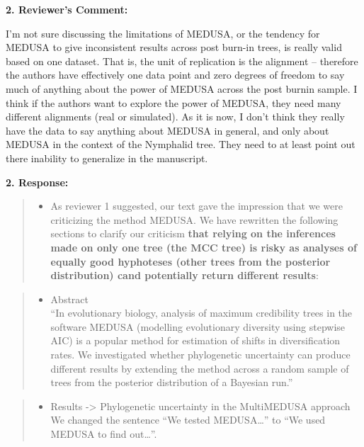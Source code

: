 \documentclass[]{article}
\begin{document}
\textbf{2. Reviewer's Comment:}

I'm not sure discussing the limitations of MEDUSA, or the tendency for
MEDUSA to give inconsistent results across post burn-in trees, is really
valid based on one dataset. That is, the unit of replication is the
alignment -- therefore the authors have effectively one data point and
zero degrees of freedom to say much of anything about the power of
MEDUSA across the post burnin sample. I think if the authors want to
explore the power of MEDUSA, they need many different alignments (real
or simulated). As it is now, I don't think they really have the data to
say anything about MEDUSA in general, and only about MEDUSA in the
context of the Nymphalid tree. They need to at least point out there
inability to generalize in the manuscript.

\textbf{2. Response:}

\begin{quote}
\color{blue}
\begin{itemize}
\itemsep1pt\parskip0pt
\item
  As reviewer 1 suggested, our text gave the impression that we were
  criticizing the method MEDUSA. We have rewritten the following
  sections to clarify our criticism \textbf{that relying on the
  inferences made on only one tree (the MCC tree) is risky as analyses
  of equally good hyphoteses (other trees from the posterior
  distribution) cand potentially return different results}:
\end{itemize}
\end{quote}

\begin{quote}
\color{blue}
\begin{itemize}
\itemsep1pt\parskip0pt
\item
  Abstract\\``In evolutionary biology, analysis of maximum credibility
  trees in the software MEDUSA (modelling evolutionary diversity using
  stepwise AIC) is a popular method for estimation of shifts in
  diversification rates. We investigated whether phylogenetic
  uncertainty can produce different results by extending the method
  across a random sample of trees from the posterior distribution of a
  Bayesian run.''
\end{itemize}
\end{quote}

\begin{quote}
\color{blue}
\begin{itemize}
\itemsep1pt\parskip0pt
\item
  Results -\textgreater{} Phylogenetic uncertainty in the MultiMEDUSA
  approach We changed the sentence ``We tested MEDUSA\ldots{}'' to ``We
  used MEDUSA to find out\ldots{}''.
\end{itemize}
\end{quote}
\end{document}
